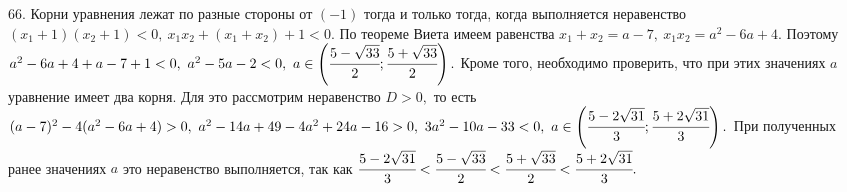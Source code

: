 66. Корни уравнения лежат по разные стороны от $(-1)$ тогда и только тогда, когда выполняется неравенство $(x_1+1)(x_2+1)<0,\ x_1x_2+(x_1+x_2)+1<0.$ По теореме Виета имеем равенства $x_1+x_2=a-7,\ x_1x_2=a^2-6a+4.$ Поэтому $a^2-6a+4+a-7+1<0,\ a^2-5a-2<0,\ a\in\left(\cfrac{5-\sqrt{33}}{2};\cfrac{5+\sqrt{33}}{2}\right).$ Кроме того, необходимо проверить, что при этих значениях $a$ уравнение имеет два корня. Для это рассмотрим неравенство $D>0,$ то есть $(a-7)^2-4(a^2-6a+4)>0,\ a^2-14a+49-4a^2+24a-16>0,\ 3a^2-10a-33<0,\ a\in\left(\cfrac{5-2\sqrt{31}}{3};\cfrac{5+2\sqrt{31}}{3}\right).$ При полученных ранее значениях $a$ это неравенство выполняется, так как $\cfrac{5-2\sqrt{31}}{3}<\cfrac{5-\sqrt{33}}{2}<\cfrac{5+\sqrt{33}}{2}<\cfrac{5+2\sqrt{31}}{3}.$\\
